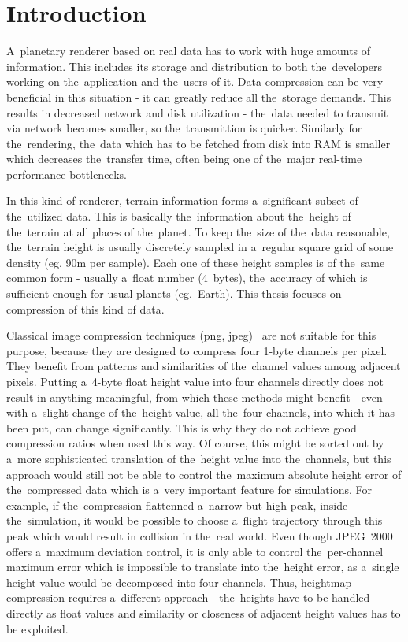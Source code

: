\chapter*{Introduction}\label{chap:introduction}

A~planetary renderer based on real data has to work with huge amounts of information. This includes its storage and distribution to both the~developers working on the~application and the~users of it. Data compression can be very beneficial in this situation - it can greatly reduce all the~storage demands. This results in decreased network and disk utilization - the~data needed to transmit via network becomes smaller, so the~transmittion is quicker. Similarly for the~rendering, the~data which has to be fetched from disk into RAM is smaller which decreases the~transfer time, often being one of the~major real-time performance bottlenecks. 

In this kind of renderer, terrain information forms a~significant subset of the~utilized data. This is basically the~information about the~height of the~terrain at all places of the~planet. To keep the~size of the~data reasonable, the~terrain height is usually discretely sampled in a~regular square grid of some density (eg. 90m per sample). Each one of these height samples is of the~same common form - usually a~float number (4~bytes), the~accuracy of which is sufficient enough for usual planets (eg.~Earth). This thesis focuses on compression of this kind of data. 

Classical image compression techniques (png, jpeg)~\cite{jpeg, basicFormats} are not suitable for this purpose, because they are designed to compress four 1-byte channels per pixel. They benefit from patterns and similarities of the~channel values among adjacent pixels. Putting a~4-byte float height value into four channels directly does not result in anything meaningful, from which these methods might benefit -  even with a~slight change of the~height value, all the~four channels, into which it has been put, can change significantly. This is why they do not achieve good compression ratios when used this way. Of course, this might be sorted out by a~more sophisticated translation of the~height value into the~channels, but this approach would still not be able to control the~maximum absolute height error of the~compressed data which is a~very important feature for simulations. For example, if the~compression flattenned a~narrow but high peak, inside the~simulation, it would be possible to choose a~flight trajectory through this peak which would result in collision in the~real world. Even though JPEG~2000 offers a~maximum deviation control, it is only able to control the~per-channel maximum error which is impossible to translate into the~height error, as a~single height value would be decomposed into four channels. Thus, heightmap compression requires a~different approach - the~heights have to be handled directly as float values and similarity or closeness of adjacent height values has to be exploited.

